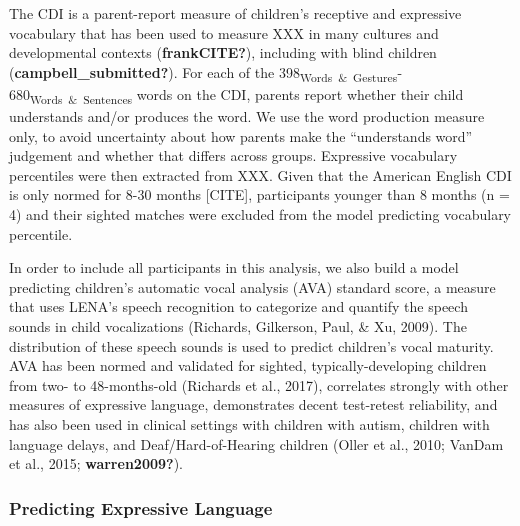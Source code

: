 \documentclass[
  man,floatsintext]{apa6}
\begin{document}
The CDI is a parent-report measure of children's receptive and expressive vocabulary that has been used to measure XXX in many cultures and developmental contexts (\textbf{frankCITE?}), including with blind children (\textbf{campbell\_submitted?}). For each of the 398\textsubscript{Words~\&~Gestures}-680\textsubscript{Words~\&~Sentences} words on the CDI, parents report whether their child understands and/or produces the word. We use the word production measure only, to avoid uncertainty about how parents make the ``understands word'' judgement and whether that differs across groups. Expressive vocabulary percentiles were then extracted from XXX. Given that the American English CDI is only normed for 8-30 months {[}CITE{]}, participants younger than 8 months (n = 4) and their sighted matches were excluded from the model predicting vocabulary percentile.

In order to include all participants in this analysis, we also build a model predicting children's automatic vocal analysis (AVA) standard score, a measure that uses LENA's speech recognition to categorize and quantify the speech sounds in child vocalizations (Richards, Gilkerson, Paul, \& Xu, 2009). The distribution of these speech sounds is used to predict children's vocal maturity. AVA has been normed and validated for sighted, typically-developing children from two- to 48-months-old (Richards et al., 2017), correlates strongly with other measures of expressive language, demonstrates decent test-retest reliability, and has also been used in clinical settings with children with autism, children with language delays, and Deaf/Hard-of-Hearing children (Oller et al., 2010; VanDam et al., 2015; \textbf{warren2009?}).

\hypertarget{predicting-expressive-language}{%
\subsubsection{Predicting Expressive Language}\label{predicting-expressive-language}}
\end{document}
